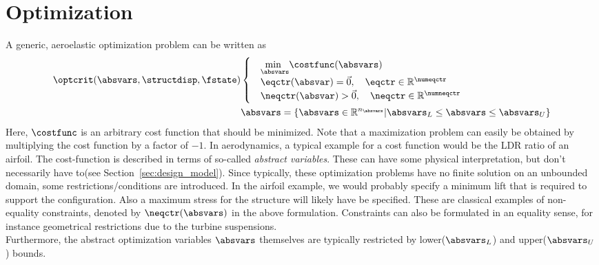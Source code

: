 \documentclass[../main.tex]{subfiles}
\begin{document}
\setlength{\delimitershortfall}{0pt}
\section{Optimization}\label{sec:about}




A generic, aeroelastic optimization problem can be written as
\begin{align}
\optcrit(\absvars,\structdisp,\fstate)
&\begin{cases}
&\underset{\absvars}{\text{min }}\costfunc(\absvars) \\%
&\eqctr(\absvar)=\vec{0},~~~\eqctr \in \mathbb{R}^{\numeqctr} \\
&\neqctr(\absvar)>\vec{0},~~~\neqctr \in \mathbb{R}^{\numneqctr} \\
\end{cases} \label{eq:generic_optimization_problem_1}\\
&\absvars = \{ \absvars \in \mathbb{R}^{n_{\absvars}} | \absvars_L \leq \absvars \leq \absvars_U \}\label{eq:generic_optimization_problem_2}
\end{align}
Here,  $\costfunc$ is an arbitrary cost function that should be minimized. Note that a maximization problem can easily be obtained by multiplying the cost function by a factor of $-1$. In aerodynamics, a typical example for a cost function would be the \ac{LDR} ratio of an airfoil. The cost-function is described in terms of so-called \textit{abstract variables}. These can have some physical interpretation, but don't necessarily have to(see Section~\ref{sec:design_model}). Since typically, these optimization problems have no finite solution on an unbounded domain, some restrictions/conditions are introduced. In the airfoil example, we would probably specify a minimum lift that is required to support the configuration. Also a maximum stress for the structure will likely have be specified. These are classical examples of non-equality constraints, denoted by $\neqctr(\absvars)$ in the above formulation. Constraints can also be formulated in an equality sense, for instance geometrical restrictions due to the turbine suspensions.\\
Furthermore, the abstract optimization variables $\absvars$ themselves are typically restricted by lower($\absvars_L$) and upper($\absvars_U$) bounds.\\
\end{document}
